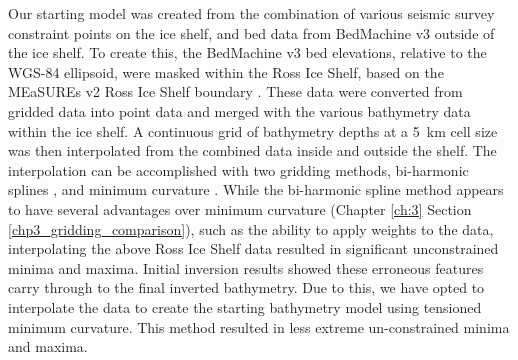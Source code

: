 Our starting model was created from the combination of various seismic survey constraint points on the ice shelf, and bed data from BedMachine v3 \citep{morlighemdeep2020, morlighemmeasures2022} outside of the ice shelf. To create this, the BedMachine v3 bed elevations, relative to the WGS-84 ellipsoid, were masked within the Ross Ice Shelf, based on the MEaSUREs v2 Ross Ice Shelf boundary \citep{mouginotmeasures2017, rignoticeshelf2013}. These data were converted from gridded data into point data and merged with the various bathymetry data within the ice shelf. A continuous grid of bathymetry depths at a 5~km cell size was then interpolated from the combined data inside and outside the shelf. The interpolation can be accomplished with two gridding methods, bi-harmonic splines \citep{sandwellbiharmonic1987}, and minimum curvature \citep{smithgridding1990}. While the bi-harmonic spline method appears to have several advantages over minimum curvature (Chapter \ref{ch:3} Section \ref{chp3_gridding_comparison}), such as the ability to apply weights to the data, interpolating the above Ross Ice Shelf data resulted in significant unconstrained minima and maxima. Initial inversion results showed these erroneous features carry through to the final inverted bathymetry. Due to this, we have opted to interpolate the data to create the starting bathymetry model using tensioned minimum curvature. This method resulted in less extreme un-constrained minima and maxima.\\


